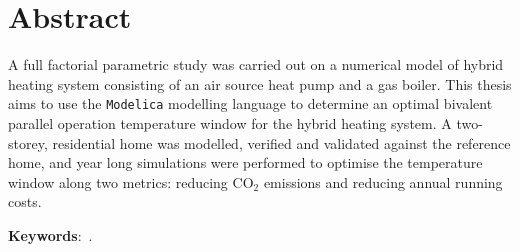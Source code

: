 

\begingroup
\let\clearpage\relax
\let\cleardoublepage\relax
\let\cleardoublepage\relax

\chapter*{Abstract}

A full factorial parametric study was carried out on a numerical model of hybrid heating system consisting of an air source heat pump and a gas boiler. This thesis aims to use the \texttt{Modelica} modelling language to determine an optimal bivalent parallel operation temperature window for the hybrid heating system. A two-storey, residential home was modelled, verified and validated against the reference home, and year long simulations were performed to optimise the temperature window along two metrics: reducing $\text{CO}_2$ emissions and reducing annual running costs. 

\bigskip\bigskip\bigskip\bigskip
\textbf{Keywords}:~\mykeywords.



\endgroup

